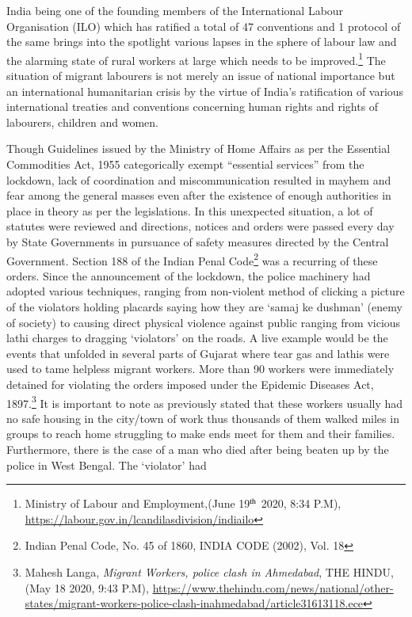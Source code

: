\begin{multicols}{2}
\noi
India being one of the founding members of the International Labour Organisation (ILO)
which has ratified a total of 47 conventions and 1 protocol of the same brings into the
spotlight various lapses in the sphere of labour law and the alarming state of rural workers at
large which needs to be improved.\footnote{Ministry of Labour and Employment,(June 19$^{\rm th}$ 2020, 8:34 P.M), \url{https://labour.gov.in/lcandilasdivision/indiailo}} The situation of migrant labourers is not merely an issue
of national importance but an international humanitarian crisis by the virtue of India’s
ratification of various international treaties and conventions concerning human rights and
rights of labourers, children and women.

\noi
Though Guidelines issued by the Ministry of Home Affairs as per the Essential Commodities
Act, 1955 categorically exempt “essential services” from the lockdown, lack of coordination
and miscommunication resulted in mayhem and fear among the general masses even after the
existence of enough authorities in place in theory as per the legislations. In this unexpected
situation, a lot of statutes were reviewed and directions, notices and orders were passed every
day by State Governments in pursuance of safety measures directed by the Central Government. Section 188 of the Indian Penal Code\footnote{Indian Penal Code, No. 45 of 1860, INDIA CODE (2002), Vol. 18} was a recurring of these orders. Since
the announcement of the lockdown, the police machinery had adopted various techniques,
ranging from non-violent method of clicking a picture of the violators holding placards
saying how they are ‘samaj ke dushman’ (enemy of society) to causing direct physical
violence against public ranging from vicious lathi charges to dragging ‘violators’ on the
roads. A live example would be the events that unfolded in several parts of Gujarat where
tear gas and lathis were used to tame helpless migrant workers. More than 90 workers were
immediately detained for violating the orders imposed under the Epidemic Diseases Act,
1897.\footnote{Mahesh Langa, \textit{Migrant Workers, police clash in Ahmedabad}, THE HINDU, (May 18 2020, 9:43 P.M),
\url{https://www.thehindu.com/news/national/other-states/migrant-workers-police-clash-inahmedabad/article31613118.ece}} It is important to note as previously stated that these workers usually had no safe
housing in the city/town of work thus thousands of them walked miles in groups to reach
home struggling to make ends meet for them and their families. Furthermore, there is the case
of a man who died after being beaten up by the police in West Bengal. The ‘violator’ had

\end{multicols}
